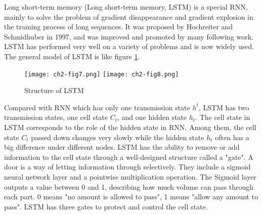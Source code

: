 Long short-term memory (Long short-term memory, LSTM) is a special RNN, mainly to solve the problem of gradient disappearance and gradient explosion in the training process of long sequences. It was proposed by Hochreiter and Schmidhuber in 1997\cite{lstm1997}, and was improved and promoted by many following work. LSTM has performed very well on a variety of problems and is now widely used. The general model of LSTM is like figure \ref{ch2-fig7}.

\begin{figure}[h]
	\centering
	\texttt{[image: ch2-fig7.png]}
	\texttt{[image: ch2-fig8.png]}
	\caption{Structure of LSTM}
	\label{ch2-fig7}
\end{figure}


Compared with RNN which has only one transmission state $h^t$, LSTM has two transmission states, one cell state $C_t$, and one hidden state $h_t$. The cell state in LSTM corresponds to the role of the hidden state in RNN. Among them, the cell state $C_t$ passed down changes very slowly while the hidden state $h_t$ often has a big difference under different nodes. LSTM has the ability to remove or add information to the cell state through a well-designed structure called a "gate". A door is a way of letting information through selectively. They include a sigmoid neural network layer and a pointwise multiplication operation. The Sigmoid layer outputs a value between 0 and 1, describing how much volume can pass through each part. 0 means "no amount is allowed to pass", 1 means "allow any amount to pass". LSTM has three gates to protect and control the cell state.

